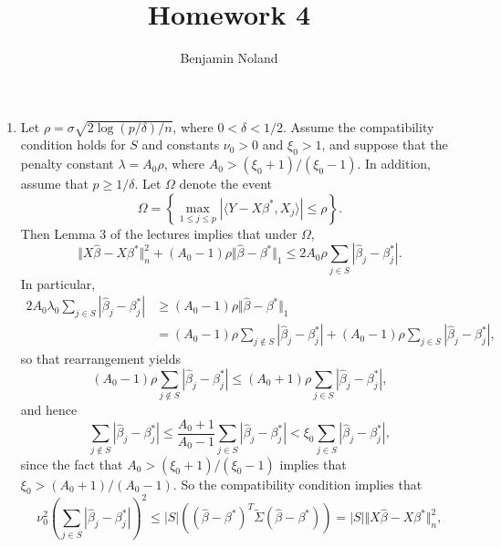 \documentclass[12pt]{article}
\title{Homework 4}
\author{Benjamin Noland}
\date{}
\begin{document}
\maketitle

\begin{enumerate}
\item
Let $\rho = \sigma \sqrt{2\log(p / \delta) / n}$, where $0 < \delta < 1/2$. Assume the compatibility condition holds for $S$ and constants $\nu_0 > 0$ and $\xi_0 > 1$, and suppose that the penalty constant $\lambda = A_0 \rho$, where $A_0 > (\xi_0 + 1) / (\xi_0 - 1)$. In addition, assume that $p \geq 1 / \delta$. Let $\Omega$ denote the event
\begin{equation*}
\Omega = \left\{\max_{1 \leq j \leq p} |\langle Y - X\beta^*, X_j \rangle| \leq \rho \right\}.
\end{equation*}
Then Lemma 3 of the lectures implies that under $\Omega$,
\begin{equation*}
\Vert X\hat{\beta} - X\beta^* \Vert_n^2 + (A_0 - 1)\rho \Vert \hat{\beta} - \beta^* \Vert_1 \leq 2A_0 \rho \sum_{j \in S} |\hat{\beta}_j - \beta^*_j|.
\end{equation*}
In particular,
\begin{align*}
2A_0 \lambda_0 \sum_{j \in S} |\hat{\beta}_j - \beta^*_j| &\geq (A_0 - 1)\rho \Vert \hat{\beta} - \beta^* \Vert_1 \\
&= (A_0 - 1) \rho \sum_{j \not \in S} |\hat{\beta}_j - \beta^*_j| + (A_0 - 1) \rho \sum_{j \in S} |\hat{\beta}_j - \beta^*_j|,
\end{align*}
so that rearrangement yields
\begin{equation*}
(A_0 - 1) \rho \sum_{j \not \in S} |\hat{\beta}_j - \beta^*_j| \leq (A_0 +1) \rho \sum_{j \in S} |\hat{\beta}_j - \beta^*_j|,
\end{equation*}
and hence
\begin{equation*}
\sum_{j \not \in S} |\hat{\beta}_j - \beta^*_j| \leq \frac{A_0 +1}{A_0 - 1} \sum_{j \in S} |\hat{\beta}_j - \beta^*_j| < \xi_0 \sum_{j \in S} |\hat{\beta}_j - \beta^*_j|,
\end{equation*}
since the fact that $A_0 > (\xi_0 + 1) / (\xi_0 - 1)$ implies that $\xi_0 > (A_0 + 1) / (A_0 - 1)$. So the compatibility condition implies that
\begin{equation*}
\nu_0^2\left(\sum_{j \in S} |\hat{\beta}_j - \beta^*_j|\right)^2 \leq |S| \left((\hat{\beta} - \beta^*)^T\widetilde{\Sigma}(\hat{\beta} - \beta^*)\right) = |S| \Vert X\hat{\beta} - X\beta^* \Vert_n^2,
\end{equation*}

\end{enumerate}
\end{document}
